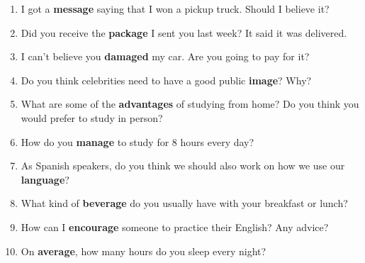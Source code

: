 \begin{enumerate}
  \item I got a \textbf{message} saying that I won a pickup truck. Should I believe it?
  \item Did you receive the \textbf{package} I sent you last week? It said it was delivered.
  \item I can't believe you \textbf{damaged} my car. Are you going to pay for it?
  \item Do you think celebrities need to have a good public \textbf{image}? Why?
  \item What are some of the \textbf{advantages} of studying from home? Do you think you would prefer to study in person?
  \item How do you \textbf{manage} to study for 8 hours every day?
  \item As Spanish speakers, do you think we should also work on how we use our \textbf{language}?
  \item What kind of \textbf{beverage} do you usually have with your breakfast or lunch?
  \item How can I \textbf{encourage} someone to practice their English? Any advice?
  \item On \textbf{average}, how many hours do you sleep every night?
\end{enumerate}

\newpage






